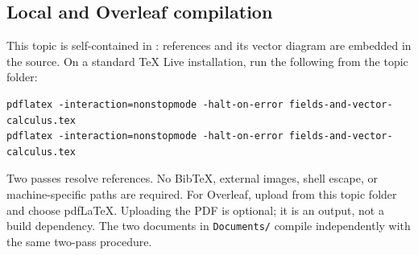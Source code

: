 \documentclass[11pt,letterpaper]{article}
\begin{document}
\subsection*{Local and Overleaf compilation}
This topic is self-contained in : references and its vector diagram are embedded in the source. On a standard TeX Live installation, run the following from the topic folder:
\begin{verbatim}
pdflatex -interaction=nonstopmode -halt-on-error fields-and-vector-calculus.tex
pdflatex -interaction=nonstopmode -halt-on-error fields-and-vector-calculus.tex
\end{verbatim}
Two passes resolve references. No BibTeX, external images, shell escape, or machine-specific paths are required. For Overleaf, upload  from this topic folder and choose pdfLaTeX. Uploading the PDF is optional; it is an output, not a build dependency. The two documents in \texttt{Documents/} compile independently with the same two-pass procedure.
\end{document}
